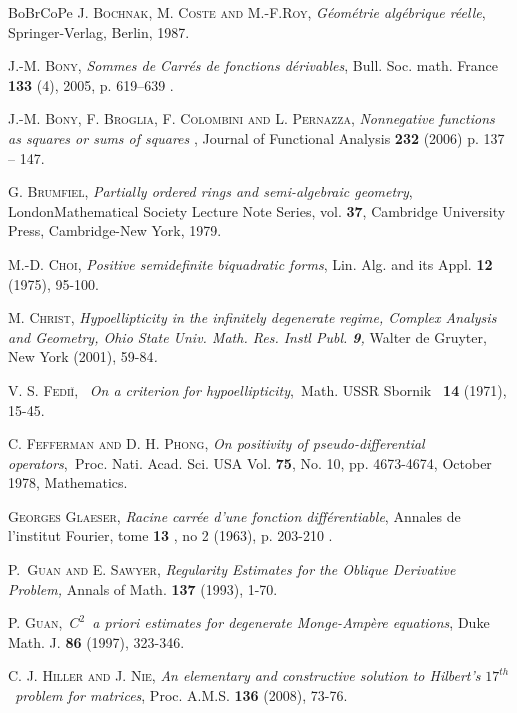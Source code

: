 \documentclass{amsart}
\theoremstyle{plain}
\numberwithin{equation}{section}
\begin{document}
\begin{thebibliography}{BoBrCoPe}
 \textsc{J. Bochnak, M. Coste and M.-F.Roy}, \textit{%
G\'{e}om\'{e}trie alg\'{e}brique r\'{e}elle}, Springer-Verlag, Berlin, 1987.

 \textsc{J.-M. Bony,} \textit{Sommes de Carr\'{e}s de
fonctions d\'{e}rivables}, Bull. Soc. math. France \textbf{133} (4), 2005,
p. 619--639 .

 \textsc{J.-M. Bony, F. Broglia, F. Colombini
and L. Pernazza}, \textit{Nonnegative functions as squares or sums of squares%
}, Journal of Functional Analysis \textbf{232} (2006) p. 137 -- 147.

 \textsc{G. Brumfiel}, \textit{Partially ordered rings and
semi-algebraic geometry}, LondonMathematical Society Lecture Note Series,
vol. \textbf{37}, Cambridge University Press, Cambridge-New York, 1979.

 \textsc{M.-D. Choi,} \textit{Positive semidefinite
biquadratic forms}, Lin. Alg. and its Appl. \textbf{12} (1975), 95-100.

 {\textsc{M. Christ, }}\textit{Hypoellipticity in the
infinitely degenerate regime, Complex Analysis and Geometry, Ohio State
Univ. Math. Res. Instl Publ. \textbf{9}, }Walter de Gruyter, New York
(2001), 59-84\textit{.}

 {\textsc{V. S. Fedi\u{\i},} \textsc{\ }\textit{On a
criterion for hypoellipticity},\textit{\ }Math. USSR Sbornik\textit{\ }%
\textbf{14} (1971), 15-45.}

 \textsc{C. Fefferman and D. H. Phong,} \textit{On
positivity of pseudo-differential operators},\textit{\ }Proc. Nati. Acad.
Sci. USA Vol. \textbf{75}, No. 10, pp. 4673-4674, October 1978, Mathematics.

 \textsc{Georges Glaeser,} \textit{Racine carr\'{e}e d'une
fonction diff\'{e}rentiable}, Annales de l'institut Fourier, tome \textbf{13}%
, no 2 (1963), p. 203-210 .

 \textsc{P.\ Guan and E. Sawyer}, \textit{Regularity
Estimates for the Oblique Derivative Problem, }Annals of Math. \textbf{137}
(1993), 1-70.

 \textsc{P. Guan,}\textit{\ }$C^{2}$\textit{\ \emph{a
priori} estimates for degenerate Monge-Amp\`{e}re equations}, Duke Math. J. 
\textbf{86} (1997), 323-346.

 \textsc{C. J. Hiller and J. Nie,} \textit{An elementary
and constructive solution to Hilbert's }$17^{th}$\textit{\ problem for
matrices}, Proc. A.M.S. \textbf{136} (2008), 73-76.


\end{thebibliography}
\end{document}
